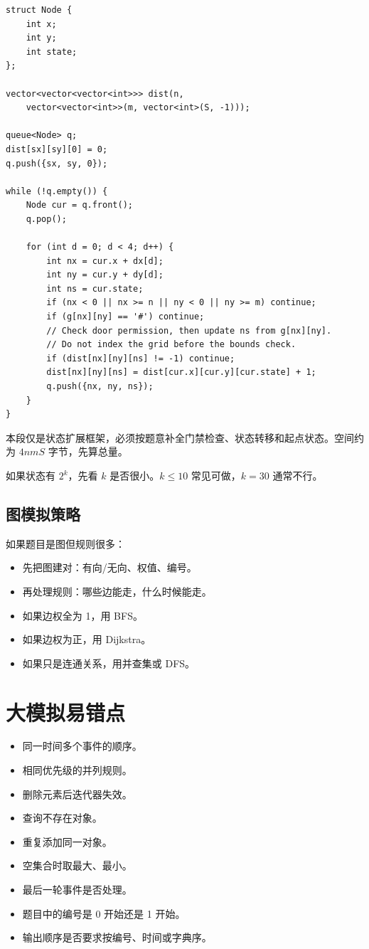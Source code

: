 \begin{lstlisting}
struct Node {
    int x;
    int y;
    int state;
};

vector<vector<vector<int>>> dist(n,
    vector<vector<int>>(m, vector<int>(S, -1)));

queue<Node> q;
dist[sx][sy][0] = 0;
q.push({sx, sy, 0});

while (!q.empty()) {
    Node cur = q.front();
    q.pop();

    for (int d = 0; d < 4; d++) {
        int nx = cur.x + dx[d];
        int ny = cur.y + dy[d];
        int ns = cur.state;
        if (nx < 0 || nx >= n || ny < 0 || ny >= m) continue;
        if (g[nx][ny] == '#') continue;
        // Check door permission, then update ns from g[nx][ny].
        // Do not index the grid before the bounds check.
        if (dist[nx][ny][ns] != -1) continue;
        dist[nx][ny][ns] = dist[cur.x][cur.y][cur.state] + 1;
        q.push({nx, ny, ns});
    }
}
\end{lstlisting}

本段仅是状态扩展框架，必须按题意补全门禁检查、状态转移和起点状态。空间约为 $4nmS$ 字节，先算总量。

如果状态有 $2^k$，先看 $k$ 是否很小。$k \le 10$ 常见可做，$k=30$ 通常不行。

\subsection{图模拟策略}

如果题目是图但规则很多：

\begin{itemize}
  \item 先把图建对：有向/无向、权值、编号。
  \item 再处理规则：哪些边能走，什么时候能走。
  \item 如果边权全为 1，用 BFS。
  \item 如果边权为正，用 Dijkstra。
  \item 如果只是连通关系，用并查集或 DFS。
\end{itemize}

\section{大模拟易错点}\label{sec:07-29}

\begin{itemize}
  \item 同一时间多个事件的顺序。
  \item 相同优先级的并列规则。
  \item 删除元素后迭代器失效。
  \item 查询不存在对象。
  \item 重复添加同一对象。
  \item 空集合时取最大、最小。
  \item 最后一轮事件是否处理。
  \item 题目中的编号是 0 开始还是 1 开始。
  \item 输出顺序是否要求按编号、时间或字典序。
\end{itemize}

